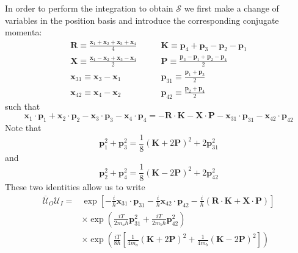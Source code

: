In order to perform the integration to obtain $\mathcal{S}$ we first make a change of variables in the position basis and introduce the corresponding conjugate momenta:
\begin{equation}
\begin{split}
	\mathbf{R} \equiv \frac{\mathbf{x}_{1} + \mathbf{x}_{2} + \mathbf{x}_{3} + \mathbf{x}_{4}}{4} &\qquad \mathbf{K} \equiv \mathbf{p}_{4} + \mathbf{p}_{3} - \mathbf{p}_{2} - \mathbf{p}_{1} \\
	\mathbf{X} \equiv \frac{\mathbf{x}_{1} - \mathbf{x}_{2} + \mathbf{x}_{3} - \mathbf{x}_{4}}{2} &\qquad \mathbf{P} \equiv \frac{\mathbf{p}_{3} - \mathbf{p}_{1} + \mathbf{p}_{2} - \mathbf{p}_{4}}{2} \\
	\mathbf{x}_{31} \equiv \mathbf{x}_{3} - \mathbf{x}_{1} &\qquad \mathbf{p}_{31} \equiv \frac{\mathbf{p}_{1} + \mathbf{p}_{3}}{2} \\
	\mathbf{x}_{42} \equiv \mathbf{x}_{4} - \mathbf{x}_{2} &\qquad \mathbf{p}_{42} \equiv \frac{\mathbf{p}_{2} + \mathbf{p}_{4}}{2}
\end{split}
\end{equation}
such that
\begin{equation}
	\mathbf{x}_{1} \cdot \mathbf{p}_{1} + \mathbf{x}_{2} \cdot \mathbf{p}_{2} - \mathbf{x}_{3} \cdot \mathbf{p}_{3} - \mathbf{x}_{4} \cdot \mathbf{p}_{4} = - \mathbf{R} \cdot \mathbf{K} - \mathbf{X} \cdot \mathbf{P} - \mathbf{x}_{31} \cdot \mathbf{p}_{31} - \mathbf{x}_{42} \cdot \mathbf{p}_{42}
\end{equation}
Note that
\begin{equation}
	\mathbf{p}_{1}^{2} + \mathbf{p}_{3}^{2} = \frac{1}{8} \left( \mathbf{K} + 2 \mathbf{P} \right)^{2} + 2 \mathbf{p}_{31}^{2}
\end{equation}
and
\begin{equation}
	\mathbf{p}_{2}^{2} + \mathbf{p}_{4}^{2} = \frac{1}{8} \left( \mathbf{K} - 2 \mathbf{P} \right)^{2} + 2 \mathbf{p}_{42}^{2}
\end{equation}
These two identities allow us to write
\begin{equation}
\begin{split}
	\overline{\mathcal{U}}_{O} \mathcal{U}_{I} = {}& \exp{\left[ -\frac{i}{\hbar} \mathbf{x}_{31} \cdot \mathbf{p}_{31} - \frac{i}{\hbar} \mathbf{x}_{42} \cdot \mathbf{p}_{42} - \frac{i}{\hbar} \left( \mathbf{R} \cdot \mathbf{K} + \mathbf{X} \cdot \mathbf{P} \right) \right]} \\
	&\times \exp{\left( \frac{i T}{2 m_{a} \hbar} \mathbf{p}_{31}^{2} + \frac{i T}{2 m_{b} \hbar} \mathbf{p}_{42}^{2} \right)} \\
	&\times \exp{\left( \frac{i T}{8 \hbar} \left[ \frac{1}{4m_{a}} \left( \mathbf{K} + 2 \mathbf{P} \right)^{2} + \frac{1}{4m_{b}} \left( \mathbf{K} - 2 \mathbf{P} \right)^{2} \right] \right)}
\end{split} \label{thirdLine}
\end{equation}

